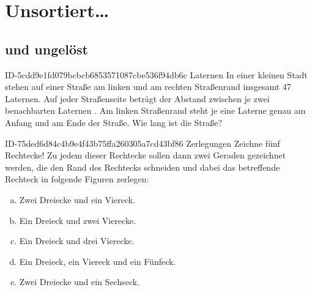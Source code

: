 \allowdisplaybreaks
\setcounter{chapter}{-1}
\chapter{Unsortiert\ldots}

\section{und ungelöst}

\begin{exercise}
      {ID-5cdd9e1fd079bcbcb6853571087cbe536f94db6c}
      {Laternen}
  \ifproblem\problem
    In einer kleinen Stadt stehen auf einer Straße am linken und am rechten
    Straßenrand insgesamt 47 Laternen.
    Auf jeder Straßenseite beträgt der Abstand zwischen je zwei benachbarten
    Laternen .
    Am linken Straßenrand steht je eine Laterne genau am Anfang und am Ende
    der Straße.
    Wie lang ist die Straße?
  \fi
\end{exercise}

\begin{exercise}
      {ID-75ded6d84c4b9e4f43b75ffa260305a7cd43bf86}
      {Zerlegungen}
  \ifproblem\problem
    Zeichne fünf Rechtecke! Zu jedem dieser Rechtecke sollen dann zwei Geraden
    gezeichnet werden, die den Rand des Rechtecks schneiden und dabei das
    betreffende Rechteck in folgende Figuren zerlegen:
    \begin{enumerate}[a)]
      \squeeze
      \item Zwei Dreiecke und ein Viereck.
      \item Ein Dreieck und zwei Vierecke.
      \item Ein Dreieck und drei Vierecke.
      \item Ein Dreieck, ein Viereck und ein Fünfeck.
      \item Zwei Dreiecke und ein Sechseck.
    \end{enumerate}
  \fi
\end{exercise}

